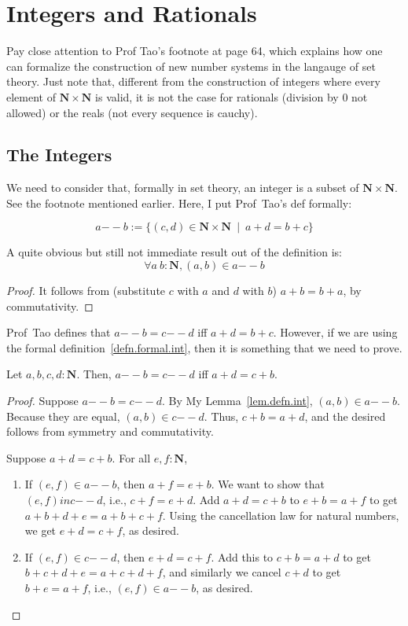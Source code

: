 
\chapter{Integers and Rationals}
Pay close attention to Prof Tao's footnote at page 64, which explains how one
can formalize the construction of new number systems in the langauge of set
theory. Just note that, different from the construction of integers where every
element of $\mathbf{N} \times \mathbf{N}$ is valid, it is not the case for
rationals (division by 0 not allowed) or the reals (not every sequence is
cauchy).

\section{The Integers}
We need to consider that, formally in set theory, an integer is a subset of
$\mathbf{N} \times \mathbf{N}$. See the footnote mentioned earlier. Here, I put
Prof~Tao's def formally:
\begin{defn}\label{defn.formal.int}
\[
	a{--}b := \{ (c,d) \in \mathbf{N}\times\mathbf{N} \ \mid\  a+d = b+c \}
\]
\end{defn}

\begin{lem}\label{lem.defn.int}
A quite obvious but still not immediate result out of the definition is:
\[
	\forall a\ b : \mathbf{N}, (a,b) \in a{--}b
\]
\end{lem}
\begin{proof}
It follows from (substitute $c$ with $a$ and $d$ with $b$) $a+b = b+a$, by
commutativity.
\end{proof}

Prof~Tao defines that $a{--}b=c{--}d$ iff $a+d=b+c$. However, if we are
using the formal definition~\ref{defn.formal.int}, then it is something that we
need to prove.
\begin{lem}\label{lem.defn.int.connection}
	Let $a,b,c,d : \mathbf{N}$. Then, $a{--}b = c{--}d$ iff $a+d=c+b$.
\end{lem}
\begin{proof}
	\myifbox Suppose $a{--}b = c{--}d$. By My Lemma~\ref{lem.defn.int}, $(a,b)
	\in a{--}b$. Because they are equal, $(a,b) \in c{--}d$. Thus, $c+b=a+d$,
	and the desired follows from symmetry and commutativity.

	\myoifbox Suppose $a+d=c+b$. For all $e,f : \mathbf{N}$, 
	\begin{enumerate}
	\item If $(e,f) \in a{--}b$, then $a+f=e+b$. We want to show that $(e,f) in
		c{--}d$, i.e., $c+f=e+d$.
		Add $a+d=c+b$ to $e+b=a+f$ to get $a+b+d+e = a+b+c+f$. Using the
		cancellation law for natural numbers, we get $e+d=c+f$, as desired.

	\item If $(e,f) \in c{--}d$, then $e+d=c+f$. Add this to $c+b=a+d$ to get
		$b+c+d+e=a+c+d+f$, and similarly we cancel $c+d$ to get $b+e=a+f$, i.e.,
		$(e,f) \in a{--}b$, as desired.
	\end{enumerate}
\end{proof}

